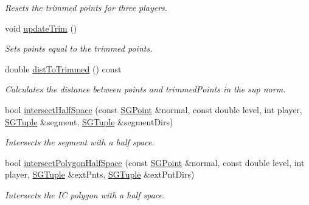\begin{DoxyCompactItemize}
\begin{DoxyCompactList}\small\item\em Resets the trimmed points for three players. \end{DoxyCompactList}\item 
\mbox{\label{classSGAction__MaxMinMax_abb81ccc819f0f17cb90c64dad7af3d41}} 
void \hyperlink{classSGAction__MaxMinMax_abb81ccc819f0f17cb90c64dad7af3d41}{update\+Trim} ()
\begin{DoxyCompactList}\small\item\em Sets points equal to the trimmed points. \end{DoxyCompactList}\item 
\mbox{\label{classSGAction__MaxMinMax_a882cc59e96c325d7339cf28ee6bf63a5}} 
double \hyperlink{classSGAction__MaxMinMax_a882cc59e96c325d7339cf28ee6bf63a5}{dist\+To\+Trimmed} () const
\begin{DoxyCompactList}\small\item\em Calculates the distance between points and trimmed\+Points in the sup norm. \end{DoxyCompactList}\item 
\mbox{\label{classSGAction__MaxMinMax_a6a7c5c65a4b8c80e919dbb0039a3831c}} 
bool \hyperlink{classSGAction__MaxMinMax_a6a7c5c65a4b8c80e919dbb0039a3831c}{intersect\+Half\+Space} (const \hyperlink{classSGPoint}{S\+G\+Point} \&normal, const double level, int player, \hyperlink{classSGTuple}{S\+G\+Tuple} \&segment, \hyperlink{classSGTuple}{S\+G\+Tuple} \&segment\+Dirs)
\begin{DoxyCompactList}\small\item\em Intersects the segment with a half space. \end{DoxyCompactList}\item 
\mbox{\label{classSGAction__MaxMinMax_ada49ec584361e9ec63b16f22f8d57468}} 
bool \hyperlink{classSGAction__MaxMinMax_ada49ec584361e9ec63b16f22f8d57468}{intersect\+Polygon\+Half\+Space} (const \hyperlink{classSGPoint}{S\+G\+Point} \&normal, const double level, int player, \hyperlink{classSGTuple}{S\+G\+Tuple} \&ext\+Pnts, \hyperlink{classSGTuple}{S\+G\+Tuple} \&ext\+Pnt\+Dirs)
\begin{DoxyCompactList}\small\item\em Intersects the IC polygon with a half space. \end{DoxyCompactList}\item 

\end{DoxyCompactItemize}
